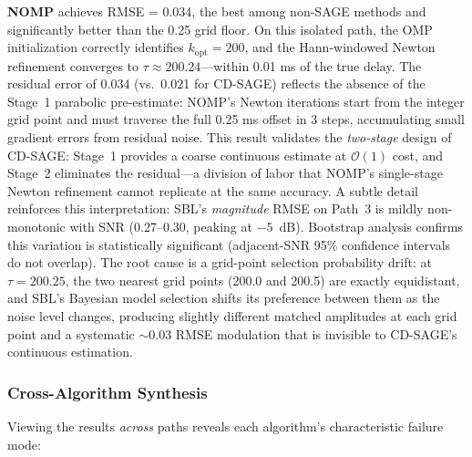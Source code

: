 \documentclass[a4paper,fleqn]{cas-dc}
\begin{document}
\textbf{NOMP} achieves RMSE = 0.034, the best among non-SAGE methods and significantly better than the 0.25 grid floor. On this isolated path, the OMP initialization correctly identifies $k_{\text{opt}} = 200$, and the Hann-windowed Newton refinement converges to $\tau \approx 200.24$---within 0.01 ms of the true delay. The residual error of 0.034 (vs.\ 0.021 for CD-SAGE) reflects the absence of the Stage~1 parabolic pre-estimate: NOMP's Newton iterations start from the integer grid point and must traverse the full 0.25 ms offset in 3 steps, accumulating small gradient errors from residual noise. This result validates the \textit{two-stage} design of CD-SAGE: Stage~1 provides a coarse continuous estimate at $\mathcal{O}(1)$ cost, and Stage~2 eliminates the residual---a division of labor that NOMP's single-stage Newton refinement cannot replicate at the same accuracy. A subtle detail reinforces this interpretation: SBL's \textit{magnitude} RMSE on Path~3 is mildly non-monotonic with SNR (0.27--0.30, peaking at $-5$~dB). Bootstrap analysis confirms this variation is statistically significant (adjacent-SNR 95\% confidence intervals do not overlap). The root cause is a grid-point selection probability drift: at $\tau=200.25$, the two nearest grid points (200.0 and 200.5) are exactly equidistant, and SBL's Bayesian model selection shifts its preference between them as the noise level changes, producing slightly different matched amplitudes at each grid point and a systematic $\sim$0.03 RMSE modulation that is invisible to CD-SAGE's continuous estimation.

\subsubsection{Cross-Algorithm Synthesis}

Viewing the results \textit{across} paths reveals each algorithm's characteristic failure mode:
\end{document}
